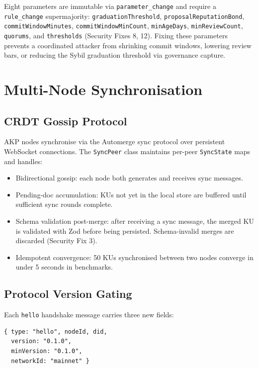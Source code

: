 \documentclass[10pt,twocolumn]{article}
\begin{document}
Eight parameters are immutable via \texttt{parameter\_change} and require a
\texttt{rule\_change} supermajority: \texttt{graduationThreshold},
\texttt{proposalReputationBond}, \texttt{commitWindowMinutes},
\texttt{commitWindowMinCount}, \texttt{minAgeDays}, \texttt{minReviewCount},
\texttt{quorums}, and \texttt{thresholds} (Security Fixes 8, 12). Fixing these
parameters prevents a coordinated attacker from shrinking commit windows,
lowering review bars, or reducing the Sybil graduation threshold via governance
capture.

\section{Multi-Node Synchronisation}

\subsection{CRDT Gossip Protocol}

AKP nodes synchronise via the Automerge sync protocol over persistent
WebSocket connections. The \texttt{SyncPeer} class maintains per-peer
\texttt{SyncState} maps and handles:

\begin{itemize}[noitemsep,topsep=2pt]
  \item Bidirectional gossip: each node both generates and receives sync
        messages.
  \item Pending-doc accumulation: KUs not yet in the local store are buffered
        until sufficient sync rounds complete.
  \item Schema validation post-merge: after receiving a sync message, the
        merged KU is validated with Zod before being persisted. Schema-invalid
        merges are discarded (Security Fix 3).
  \item Idempotent convergence: 50 KUs synchronised between two nodes converge
        in under 5 seconds in benchmarks.
\end{itemize}

\subsection{Protocol Version Gating}

Each \texttt{hello} handshake message carries three new fields:

\begin{lstlisting}[language={}]
{ type: "hello", nodeId, did,
  version: "0.1.0",
  minVersion: "0.1.0",
  networkId: "mainnet" }
\end{lstlisting}
\end{document}
